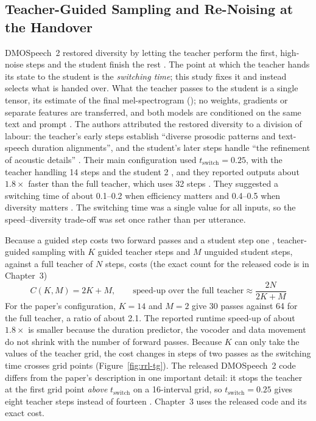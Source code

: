 \subsection{Teacher-Guided Sampling and Re-Noising at the Handover}
\label{sec:rrl-handover}

DMOSpeech~2 restored diversity by letting the teacher perform the first, high-noise steps and the student finish the rest \parencite{li2025dmospeech2}. The point at which the teacher hands its state to the student is the \emph{switching time}; this study fixes it and instead selects what is handed over. What the teacher passes to the student is a single tensor, its estimate of the final mel-spectrogram (); no weights, gradients or separate features are transferred, and both models are conditioned on the same text and prompt \parencite{li2025dmospeech2code}. The authors attributed the restored diversity to a division of labour: the teacher's early steps establish \enquote{diverse prosodic patterns and text-speech duration alignments}, and the student's later steps handle \enquote{the refinement of acoustic details} \parencite[p.~31818]{li2025dmospeech2}. Their main configuration used $t_{\text{switch}}=0.25$, with the teacher handling 14 steps and the student 2 \parencite[p.~31819]{li2025dmospeech2}, and they reported outputs about $1.8\times$ faster than the full teacher, which uses 32 steps \parencite[pp.~31818--31819]{li2025dmospeech2}. They suggested a switching time of about 0.1--0.2 when efficiency matters and 0.4--0.5 when diversity matters \parencite[p.~31818]{li2025dmospeech2}. The switching time was a single value for all inputs, so the speed--diversity trade-off was set once rather than per utterance.

Because a guided step costs two forward passes \parencite{ho2022cfg,yang2025shallow} and a student step one \parencite{li2025dmospeech2,li2024dmospeech}, teacher-guided sampling with $K$ guided teacher steps and $M$ unguided student steps, against a full teacher of $N$ steps, costs (the exact count for the released code is  in Chapter~3)
\begin{equation}
C(K,M) = 2K + M, \qquad \text{speed-up over the full teacher} \approx \frac{2N}{2K+M}
\label{eq:tgcost}
\end{equation}
For the paper's configuration, $K=14$ and $M=2$ give 30 passes against 64 for the full teacher, a ratio of about 2.1. The reported runtime speed-up of about $1.8\times$ is smaller because the duration predictor, the vocoder and data movement do not shrink with the number of forward passes. Because $K$ can only take the values of the teacher grid, the cost changes in steps of two passes as the switching time crosses grid points (Figure~\ref{fig:rrl-tg}). The released DMOSpeech~2 code differs from the paper's description in one important detail: it stops the teacher at the first grid point \emph{above} $t_{\text{switch}}$ on a 16-interval grid, so $t_{\text{switch}}=0.25$ gives eight teacher steps instead of fourteen \parencite{li2025dmospeech2code}. Chapter~3 uses the released code and its exact cost.

